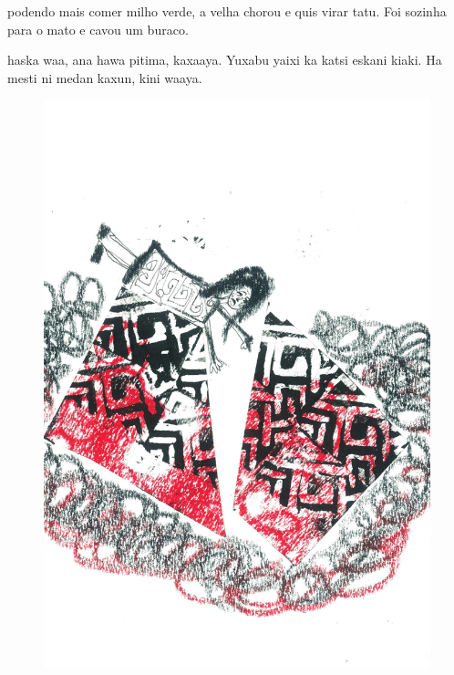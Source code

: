 
 podendo mais comer milho verde,
a velha chorou e quis virar tatu.
Foi sozinha para o mato e cavou um buraco.

\vspace{2em}

 haska waa, ana hawa pitima,
kaxaaya. Yuxabu yaixi ka katsi eskani kiaki.
Ha mesti ni medan kaxun, kini waaya.

\vspace*{\fill}

\pagebreak
\thispagestyle{empty}
\begin{figure}
\vspace*{-.5cm}
\hspace*{-2.2cm}\includegraphics[width=138mm]{./imgs/img7.pdf}
\end{figure}


